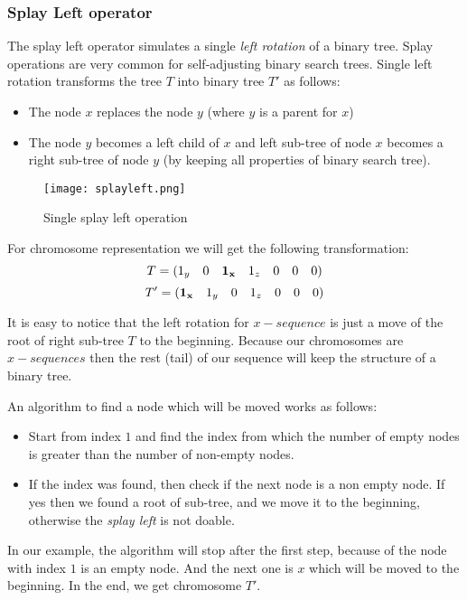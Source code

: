 \documentclass[12pt]{article}
\begin{document}
\subsubsection{Splay Left operator}

The splay left operator simulates a single \textit{left rotation} of a binary tree. Splay operations are very common for self-adjusting binary search trees. Single left rotation transforms the tree $T$ into binary tree $T'$ as follows:
\begin{itemize}
\item The node $x$ replaces the node $y$ (where $y$ is a parent for $x$)
\item The node $y$ becomes a left child of $x$ and left sub-tree of node $x$ becomes a right sub-tree of node $y$ (by keeping all properties of binary search tree).
\end{itemize}

\begin{figure}[ht]
\centering
\texttt{[image: splayleft.png]}
\caption{Single splay left operation}
\label{fig:splayleft}
\end{figure}

For chromosome representation we will get the following transformation:
\[
    T = (1_y \quad 0 \quad {\bf 1_x} \quad 1_z \quad 0 \quad 0 \quad 0)
\]
\[
    T' = ({\bf 1_x} \quad 1_y \quad 0 \quad 1_z \quad 0 \quad 0 \quad 0)
\]

It is easy to notice that the left rotation for $x-sequence$ is just a move of the root of right sub-tree $T$ to the beginning. Because our chromosomes are $x-sequences$ then the rest (tail) of our sequence will keep the structure of a binary tree.

An algorithm to find a node which will be moved works as follows:
\begin{itemize}
\item Start from index $1$ and find the index from which the number of empty nodes is greater than the number of non-empty nodes.
\item If the index was found, then check if the next node is a non empty node. If yes then we found a root of sub-tree, and we move it to the beginning, otherwise the \textit{splay left} is not doable.
\end{itemize}

In our example, the algorithm will stop after the first step, because of the node with index $1$ is an empty node. And the next one is $x$ which will be moved to the beginning. In the end, we get chromosome $T'$.
\end{document}
